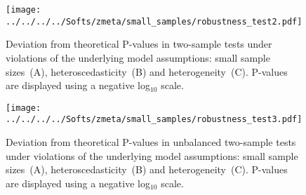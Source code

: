 \documentclass[preprint]{elsarticle}
\DeclareMathOperator{\Var}{Var}
\newcommand{\effectvector}{\hat\beta}
\newcommand{\effect}[1][i]{\effectvector_{#1}}
\newcommand{\vareffect}[1][i]{s^2_{#1}}
\newcommand{\zeffect}[1][\studyidx]{Z_{#1}}
\newcommand{\peffect}[1][\studyidx]{P_{#1}}
\newcommand{\nStudies}{k}
\newcommand{\studyidx}{i}
\newcommand{\varCombined}{\sigma^2_{C}}
\newcommand{\metaanalyticeffect}[1][i]{\gamma_{#1}}
\newcommand{\estvarBetween}{\hat\tau^2}
\newcommand{\nSubjects}[1][i]{n_{#1}}
\newcommand{\varWithinConInv}[1][i]{\nSubjects[#1] / \sigma^2_{#1}}
\begin{document}



\begin{figure}[h]
	\centering
 	\texttt{[image: ../../../../Softs/zmeta/small\_samples/robustness\_test2.pdf]}
	\caption{Deviation from theoretical P-values in two-sample tests under violations of the underlying model assumptions: small sample sizes~(A), heteroscedasticity~(B) and heterogeneity~(C). P-values are displayed using a negative log$_{10}$ scale.}
	\label{fig:robustness_test2}
\end{figure}

\begin{figure}[h]
	\centering
 	\texttt{[image: ../../../../Softs/zmeta/small\_samples/robustness\_test3.pdf]}
	\caption{Deviation from theoretical P-values in unbalanced two-sample tests under violations of the underlying model assumptions: small sample sizes~(A), heteroscedasticity~(B) and heterogeneity~(C). P-values are displayed using a negative log$_{10}$ scale.}
	\label{fig:robustness_test3}
\end{figure}
\end{document}
